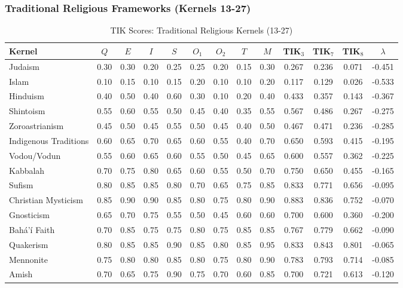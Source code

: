 \documentclass[11pt,a4paper]{article}
\theoremstyle{definition}
\theoremstyle{remark}
\begin{document}
\subsubsection{Traditional Religious Frameworks (Kernels 13-27)}

\begin{table}[H]
\centering
\caption{TIK Scores: Traditional Religious Kernels (13-27)}
\label{tab:tik-religious}
\small
\begin{tabular}{@{}l|ccccccc|c|cccc@{}}
\toprule
\textbf{Kernel} & $Q$ & $E$ & $I$ & $S$ & $O_1$ & $O_2$ & $T$ & $M$ & \textbf{TIK$_3$} & \textbf{TIK$_7$} & \textbf{TIK$_8$} & $\lambda$ \\
\midrule
Judaism & 0.30 & 0.30 & 0.20 & 0.25 & 0.25 & 0.20 & 0.15 & 0.30 & 0.267 & 0.236 & 0.071 & -0.451 \\
Islam & 0.10 & 0.15 & 0.10 & 0.15 & 0.20 & 0.10 & 0.10 & 0.20 & 0.117 & 0.129 & 0.026 & -0.533 \\
Hinduism & 0.40 & 0.50 & 0.40 & 0.60 & 0.30 & 0.10 & 0.20 & 0.40 & 0.433 & 0.357 & 0.143 & -0.367 \\
Shintoism & 0.55 & 0.60 & 0.55 & 0.50 & 0.45 & 0.40 & 0.35 & 0.55 & 0.567 & 0.486 & 0.267 & -0.275 \\
Zoroastrianism & 0.45 & 0.50 & 0.45 & 0.55 & 0.50 & 0.45 & 0.40 & 0.50 & 0.467 & 0.471 & 0.236 & -0.285 \\
Indigenous Traditions & 0.60 & 0.65 & 0.70 & 0.65 & 0.60 & 0.55 & 0.40 & 0.70 & 0.650 & 0.593 & 0.415 & -0.195 \\
Vodou/Vodun & 0.55 & 0.60 & 0.65 & 0.60 & 0.55 & 0.50 & 0.45 & 0.65 & 0.600 & 0.557 & 0.362 & -0.225 \\
Kabbalah & 0.70 & 0.75 & 0.80 & 0.65 & 0.60 & 0.55 & 0.50 & 0.70 & 0.750 & 0.650 & 0.455 & -0.165 \\
Sufism & 0.80 & 0.85 & 0.85 & 0.80 & 0.70 & 0.65 & 0.75 & 0.85 & 0.833 & 0.771 & 0.656 & -0.095 \\
Christian Mysticism & 0.85 & 0.90 & 0.90 & 0.85 & 0.80 & 0.75 & 0.80 & 0.90 & 0.883 & 0.836 & 0.752 & -0.070 \\
Gnosticism & 0.65 & 0.70 & 0.75 & 0.55 & 0.50 & 0.45 & 0.60 & 0.60 & 0.700 & 0.600 & 0.360 & -0.200 \\
Bahá'í Faith & 0.70 & 0.85 & 0.75 & 0.75 & 0.80 & 0.75 & 0.85 & 0.85 & 0.767 & 0.779 & 0.662 & -0.090 \\
Quakerism & 0.80 & 0.85 & 0.85 & 0.90 & 0.85 & 0.80 & 0.85 & 0.95 & 0.833 & 0.843 & 0.801 & -0.065 \\
Mennonite & 0.75 & 0.80 & 0.80 & 0.85 & 0.80 & 0.75 & 0.80 & 0.90 & 0.783 & 0.793 & 0.714 & -0.085 \\
Amish & 0.70 & 0.65 & 0.75 & 0.90 & 0.75 & 0.70 & 0.60 & 0.85 & 0.700 & 0.721 & 0.613 & -0.120 \\
\bottomrule
\end{tabular}
\end{table}
\end{document}
